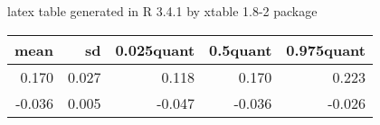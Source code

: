 
 latex table generated in R 3.4.1 by xtable 1.8-2 package
\begin{table}[ht]
\centering
\begin{tabular}{rrrrr}
  \hline
mean & sd & 0.025quant & 0.5quant & 0.975quant \\ 
  \hline
0.170 & 0.027 & 0.118 & 0.170 & 0.223 \\ 
  -0.036 & 0.005 & -0.047 & -0.036 & -0.026 \\ 
   \hline
\end{tabular}
\end{table}
